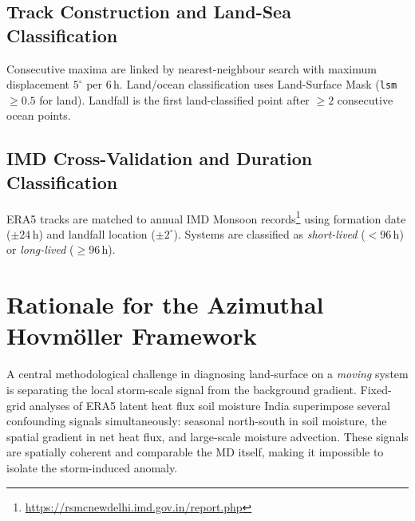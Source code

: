 \subsection{Track Construction and Land-Sea Classification}
\label{subsec:tracking}

Consecutive maxima are linked by nearest-neighbour search with
maximum displacement $5^\circ$ per 6\,h. Land/ocean classification
uses Land-Surface Mask (\texttt{lsm} $\geq 0.5$ for land). Landfall is the first
land-classified point after $\geq 2$ consecutive ocean points.


\subsection{IMD Cross-Validation and Duration Classification}
\label{subsec:imd_validation}

ERA5 tracks are matched to annual IMD Monsoon
records\footnote{\url{https://rsmcnewdelhi.imd.gov.in/report.php}}
using formation date ($\pm 24$\,h) and landfall location ($\pm
2^\circ$). Systems are classified as \emph{short-lived} ($< 96$\,h)
or \emph{long-lived} ($\geq 96$\,h).

\section{Rationale for the Azimuthal Hovm\"{o}ller Framework}
\label{sec:hovmoller_rationale}

A central methodological challenge in diagnosing land-surface on a
\emph{moving} system is separating the local storm-scale signal from
the background gradient. Fixed-grid analyses of ERA5 latent heat flux
soil moisture India superimpose several confounding signals
simultaneously: seasonal north-south in soil moisture, the spatial
gradient in net heat flux, and large-scale moisture advection. These
signals are spatially coherent and comparable the MD itself, making it
impossible to isolate the storm-induced anomaly.

